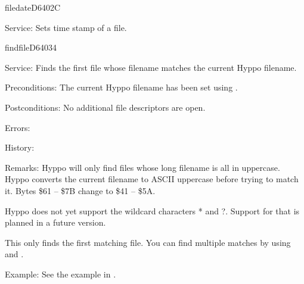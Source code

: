 \newpage
\begin{hyppotrap}{filedate}{D640}{2C}
\item [Service:]
  Sets time stamp of a file.
\notimplemented
\end{hyppotrap}


%
\newpage
\begin{hyppotrap}{findfile}{D640}{34}
\item [Service:]
  Finds the first file whose filename matches the current Hyppo filename.
\item [Preconditions:]
  The current Hyppo filename has been set using .
\item [Postconditions:]
  No additional file descriptors are open.
\item [Errors:]
\item [History:]
\item [Remarks:]
  Hyppo will only find files whose long filename is all in uppercase.
  Hyppo converts the current filename to ASCII uppercase before trying
  to match it. Bytes \$61 -- \$7B change to \$41 -- \$5A.

  Hyppo does not yet support the wildcard characters * and ?. Support
  for that is planned in a future version.

  This only finds the first matching file. You can find multiple matches by
  using  and .
\item [Example:]
  See the example in .
\end{hyppotrap}


